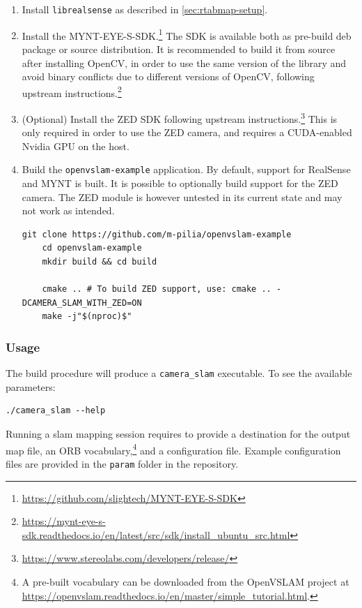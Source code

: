 \documentclass[11pt, letterpaper, twoside]{article}
\begin{document}
\begin{enumerate}
    \item Install \texttt{librealsense} as described in
        \cref{sec:rtabmap-setup}.

    \item Install the
        MYNT-EYE-S-SDK.\footnote{\url{https://github.com/slightech/MYNT-EYE-S-SDK}}
        The SDK is available both as pre-build deb package or source
        distribution. It is recommended to build it from source after
        installing OpenCV, in order to use the same version of the library and
        avoid binary conflicts due to different versions of OpenCV, following
        upstream
        instructions.\footnote{\url{https://mynt-eye-s-sdk.readthedocs.io/en/latest/src/sdk/install_ubuntu_src.html}}

    \item (Optional) Install the ZED SDK following upstream
        instructions.\footnote{\url{https://www.stereolabs.com/developers/release/}}
        This is only required in order to use the ZED camera, and requires a
        CUDA-enabled Nvidia GPU on the host.

    \item Build the \texttt{openvslam-example} application. By default, support
        for RealSense and MYNT is built. It is possible to optionally build
        support for the ZED camera. The ZED module is however untested in its
        current state and may not work as intended.
\begin{Verbatim}[samepage=true]
    git clone https://github.com/m-pilia/openvslam-example
    cd openvslam-example
    mkdir build && cd build

    cmake .. # To build ZED support, use: cmake .. -DCAMERA_SLAM_WITH_ZED=ON
    make -j"$(nproc)$"
\end{Verbatim}

\end{enumerate}

\subsubsection{Usage}

The build procedure will produce a \texttt{camera\_slam} executable. To see the
available parameters:
\begin{Verbatim}[samepage=true]
    ./camera_slam --help
\end{Verbatim}

Running a \gls{slam} mapping session requires to provide a destination for the
output map file, an ORB vocabulary,\footnote{A pre-built vocabulary can be
downloaded from the OpenVSLAM project at
\url{https://openvslam.readthedocs.io/en/master/simple_tutorial.html}.} and a
configuration file. Example configuration files are provided in the
\texttt{param} folder in the repository.
\end{document}
